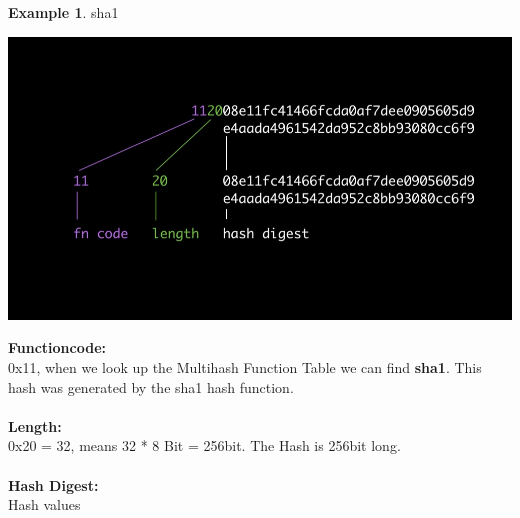 \documentclass[a4paper,11pt, oneside]{report}
\theoremstyle{definition}
\newtheorem{exmp}{Example}[subsection]
\begin{document}
\newpage
\begin{exmp} sha1
\begin{center}
	\includegraphics[width=\textwidth]{img/multihash_example.jpg}
\end{center}
\textbf{Functioncode:}\\
0x11, when we look up the Multihash Function Table we can find \textbf{sha1}. This hash was generated by the sha1 hash function.\\ \\
\textbf{Length:}\\
0x20 = 32, means 32 * 8 Bit = 256bit. The Hash is 256bit long.\\ \\
\textbf{Hash Digest:}\\ Hash values 
\end{exmp}

\newpage
\end{document}
